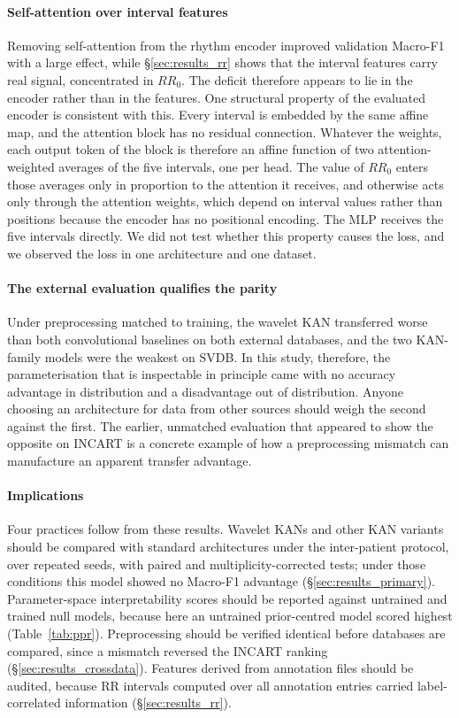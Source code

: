 \documentclass[preprint,12pt]{elsarticle}
\begin{document}
\paragraph{Self-attention over interval features} Removing self-attention from the rhythm encoder improved validation Macro-F1 with a large effect, while \S\ref{sec:results_rr} shows that the interval features carry real signal, concentrated in $RR_0$. The deficit therefore appears to lie in the encoder rather than in the features. One structural property of the evaluated encoder is consistent with this. Every interval is embedded by the same affine map, and the attention block has no residual connection. Whatever the weights, each output token of the block is therefore an affine function of two attention-weighted averages of the five intervals, one per head. The value of $RR_0$ enters those averages only in proportion to the attention it receives, and otherwise acts only through the attention weights, which depend on interval values rather than positions because the encoder has no positional encoding. The MLP receives the five intervals directly. We did not test whether this property causes the loss, and we observed the loss in one architecture and one dataset.

\paragraph{The external evaluation qualifies the parity} Under preprocessing matched to training, the wavelet KAN transferred worse than both convolutional baselines on both external databases, and the two KAN-family models were the weakest on SVDB. In this study, therefore, the parameterisation that is inspectable in principle came with no accuracy advantage in distribution and a disadvantage out of distribution. Anyone choosing an architecture for data from other sources should weigh the second against the first. The earlier, unmatched evaluation that appeared to show the opposite on INCART is a concrete example of how a preprocessing mismatch can manufacture an apparent transfer advantage.

\paragraph{Implications} Four practices follow from these results. Wavelet KANs and other KAN variants should be compared with standard architectures under the inter-patient protocol, over repeated seeds, with paired and multiplicity-corrected tests; under those conditions this model showed no Macro-F1 advantage (\S\ref{sec:results_primary}). Parameter-space interpretability scores should be reported against untrained and trained null models, because here an untrained prior-centred model scored highest (Table~\ref{tab:ppr}). Preprocessing should be verified identical before databases are compared, since a mismatch reversed the INCART ranking (\S\ref{sec:results_crossdata}). Features derived from annotation files should be audited, because RR intervals computed over all annotation entries carried label-correlated information (\S\ref{sec:results_rr}).
\end{document}
